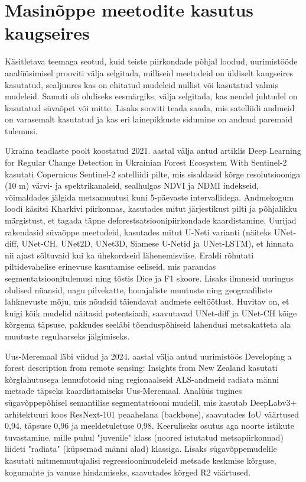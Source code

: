 \section{Masinõppe meetodite kasutus kaugseires}
Käsitletava teemaga seotud, kuid teiste piirkondade põhjal loodud, uurimistööde analüüsimisel prooviti välja selgitada, milliseid meetodeid on üldiselt kaugseires kasutatud, sealjuures kas on ehitatud mudeleid nullist või kasutatud
valmis mudeleid. Samuti oli oluliseks eesmärgiks, välja selgitada, kas nendel juhtudel on kasutatud süvaõpet või mitte. Lisaks sooviti teada saada, mis satelliidi andmeid on varasemalt kasutatud ja kas eri lainepikkuste sidumine on andnud paremaid tulemusi.

Ukraina teadlaste poolt koostatud 2021. aastal välja antud artiklis \glqq Deep Learning for Regular Change
Detection in Ukrainian Forest Ecosystem With Sentinel-2\grqq{} kasutati Copernicus Sentinel-2 satelliidi pilte, mis sisaldasid kõrge resolutsiooniga (10 m) värvi- ja spektrikanaleid, sealhulgas NDVI ja NDMI indekseid, võimaldades jälgida metsamuutusi kuni 5-päevaste intervallidega. Andmekogum loodi käsitsi Kharkivi piirkonnas, kasutades mitut järjestikust pilti ja põhjalikku märgistust, et tagada täpne deforestsatsioonipiirkondade kaardistamine. Uurijad rakendasid süvaõppe meetodeid, kasutades mitut U-Neti varianti (näiteks UNet-diff, UNet-CH, UNet2D, UNet3D, Siamese U-Netid ja UNet-LSTM), et hinnata nii ajast sõltuvaid kui ka ühekordseid lähenemisviise. Eraldi rõhutati piltidevahelise erinevuse kasutamise eeliseid, mis parandas segmentatsioonitulemusi ning tõstis Dice ja F1 skoore. Lisaks ilmnesid uuringus olulised nüansid, nagu pilvekatte, hooajaliste muutuste ning geograafiliste lahknevuste mõju, mis nõudsid täiendavat andmete eeltöötlust. Huvitav on, et kuigi kõik mudelid näitasid potentsiaali, saavutavad UNet-diff ja UNet-CH kõige kõrgema täpsuse, pakkudes seeläbi tõenduspõhiseid lahendusi metsakatteta ala muutuste regulaarseks jälgimiseks. \cite{isaienkovDeepLearningRegular2021}

Uus-Meremaal läbi viidud ja 2024. aastal välja antud uurimistöös \glqq Developing a forest description from remote sensing: Insights from
New Zealand\grqq{} kasutati kõrglahutusega lennufotosid ning regionaalseid ALS-andmeid radiata männi metsade täpseks kaardistamiseks Uus-Meremaal. Analüüs tugines sügavõppepõhisel semantilise segmentatsiooni mudelil, mis kasutab DeepLabv3+ arhitektuuri koos ResNext-101 peaahelana (backbone), saavutades IoU väärtused 0,94, täpsuse 0,96 ja meeldetuletuse 0,98. Keeruliseks osutus aga noorte istikute tuvastamine, mille puhul "juvenile" klass (noored istutatud metsapiirkonnad) liideti "radiata" (küpsemad männi alad) klassiga. Lisaks sügavõppemudelile kasutati mitmemuutujalisi regressioonimudeleid metsade keskmise kõrguse, kogumahte ja vanuse hindamiseks, saavutades kõrged R2 väärtused. \cite{pearseDevelopingForestDescription2025}